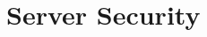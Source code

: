 \documentclass{article}
\begin{document}
\section{Server Security}
\label{sec:serversec}










\end{document}
